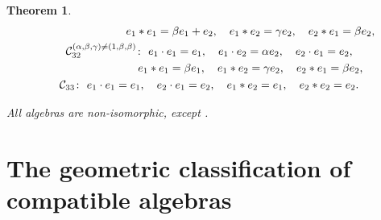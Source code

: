 \documentclass[10pt,a4paper]{amsart}
\numberwithin{equation}{section}
\newtheorem{Theorem}{Theorem}[section]
\begin{document}
\begin{Theorem}
\begin{gather*}
\hphantom{\mathcal{C}_{31}^{(\alpha ,\beta ,\gamma) \neq (1,\beta,\beta) } \colon} \
 e_{1}\ast e_{1}=\beta e_{1}+e_{2} , \quad e_{1}\ast e_{2}=\gamma e_{2} , \quad
e_{2}\ast e_{1}=\beta e_{2},
\\
 \mathcal{C}_{32}^{(\alpha ,\beta ,\gamma) \neq (1,\beta,\beta) } \colon\
e_{1}\cdot e_{1}=e_{1} , \quad e_{1}\cdot e_{2}=\alpha e_{2} , \quad e_{2}\cdot
e_{1}=e_{2} , \\
\hphantom{\mathcal{C}_{32}^{(\alpha ,\beta ,\gamma) \neq (1,\beta,\beta) } \colon} \
 e_{1}\ast e_{1}=\beta e_{1} , \quad e_{1}\ast e_{2}=\gamma e_{2} , \quad
e_{2}\ast e_{1}=\beta e_{2},
\\
 \mathcal{C}_{33} \colon\
 e_{1}\cdot e_{1}=e_{1} , \quad e_{2}\cdot e_{1}=e_{2} , \quad
 e_{1}\ast e_{2}=e_{1} , \quad e_{2}\ast e_{2}=e_{2}. %
\end{gather*}

All algebras are non-isomorphic, except
.
\end{Theorem}

\section{The geometric classification of compatible algebras}
\end{document}
